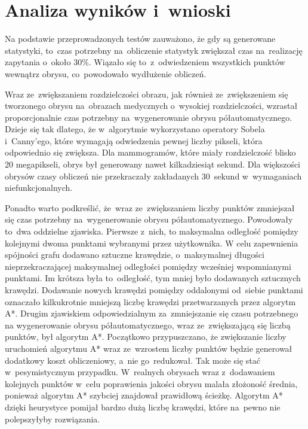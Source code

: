 \documentclass[a4paper,11pt,twoside,openright]{report}
\theoremstyle{definition}
\begin{document}
\section {Analiza wyników i~wnioski}

Na podstawie przeprowadzonych testów
zauważono, że gdy są generowane statystyki, to~czas potrzebny na~obliczenie statystyk
zwiększał czas na~realizację zapytania o~około 30\%. Wiązało się to~z~odwiedzeniem
wszystkich punktów wewnątrz obrysu, co~powodowało wydłużenie obliczeń.

Wraz ze~zwiększaniem rozdzielczości obrazu, jak również ze~zwiększeniem się
tworzonego obrysu na~obrazach medycznych o~wysokiej rozdzielczości, wzrastał proporcjonalnie
czas potrzebny na~wygenerowanie obrysu półautomatycznego. Dzieje się tak dlatego,
że w~algorytmie wykorzystano operatory Sobela i~Canny'ego, które wymagają odwiedzenia
pewnej liczby pikseli, która odpowiednio się zwiększa. Dla mammogramów, które miały rozdzielczość
blisko 20 megapikseli, obrys był generowany nawet kilkadziesiąt sekund. Dla większości obrysów
czasy obliczeń nie przekraczały zakładanych 30~sekund w~wymaganiach niefunkcjonalnych.

Ponadto warto podkreślić, że~wraz
ze~zwiększaniem liczby punktów zmniejszał się czas potrzebny na~wygenerowanie
obrysu półautomatycznego. Powodowały to~dwa oddzielne zjawiska. Pierwsze z~nich, to
maksymalna odległość pomiędzy kolejnymi dwoma punktami wybranymi przez użytkownika.
W celu zapewnienia spójności grafu dodawano sztuczne krawędzie, o~maksymalnej długości
nieprzekraczającej maksymalnej odległości pomiędzy wcześniej wspomnianymi punktami.
Im krótsza była to~odległość, tym mniej było dodawanych sztucznych krawędzi.
Dodawanie nowych krawędzi pomiędzy oddalonymi od~siebie punktami oznaczało
kilkukrotnie mniejszą liczbę krawędzi przetwarzanych przez algorytm
A*. Drugim zjawiskiem odpowiedzialnym za~zmniejszanie się czasu potrzebnego na
wygenerowanie obrysu półautomatycznego, wraz ze~zwiększającą się liczbą punktów,
był algorytm A*. Początkowo przypuszczano, że zwiększanie liczby uruchomień algorytmu
A* wraz ze~wzrostem liczby punktów będzie generował dodatkowy koszt obliczeniowy,
a~nie go~redukował. Tak może się stać w~pesymistycznym przypadku. W~realnych
obrysach wraz z~dodawaniem kolejnych punktów w~celu poprawienia jakości obrysu
malała złożoność średnia, ponieważ algorytm A* szybciej znajdował prawidłową
ścieżkę. Algorytm A* dzięki heurystyce pomijał bardzo dużą liczbę krawędzi,
które na~pewno nie polepszyłyby rozwiązania.
\end{document}

